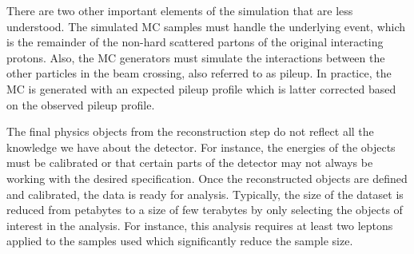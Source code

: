 There are two other important elements of the simulation that are less understood. The simulated MC samples must handle the underlying event, which is the remainder of the non-hard scattered partons of 
the original interacting protons. Also, the MC generators must simulate the interactions between the other particles in the beam crossing, also referred to as pileup. In practice, 
the MC is generated with an expected pileup profile which is latter corrected based on the observed pileup profile.


The final physics objects from the reconstruction step do not reflect all the knowledge we have about the detector. For instance, the energies of the objects must be calibrated
or that certain parts of the detector may not always be working with the desired specification. 
 Once the reconstructed objects are defined and calibrated, the data is ready for analysis. Typically, the size of the dataset is reduced from petabytes to a size of few terabytes
  by only selecting the objects of interest in the analysis. For instance, this analysis requires at least two leptons applied to the samples used which significantly reduce the sample size.
